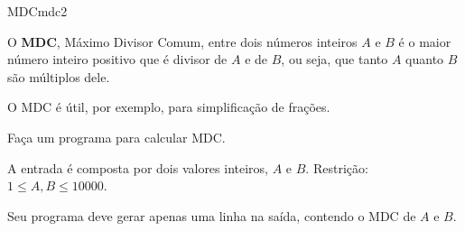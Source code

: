 \documentclass[12pt,a4paper,oneside]{article}
\begin{document}
\begin{problem}{MDC}{mdc}{2}
 
O \textbf{MDC}, Máximo Divisor Comum, entre dois números inteiros $A$ e $B$ é o maior número inteiro positivo que é divisor de $A$ e de $B$, ou seja, que tanto $A$ quanto $B$ são múltiplos dele.

O MDC é útil, por exemplo, para simplificação de frações.

Faça um programa para calcular MDC.

%

\InputFile

A entrada é composta por dois valores inteiros, $A$ e $B$. Restrição: $1 \leq A, B \leq 10000$.


\OutputFile

Seu programa deve gerar apenas uma linha na saída, contendo o MDC de $A$ e $B$.


\Example

\begin{example}
%
\end{example}

\begin{example}
%
\end{example}

\begin{example}
%
\end{example}

\begin{example}
%
\end{example}


\end{problem}
\end{document}
